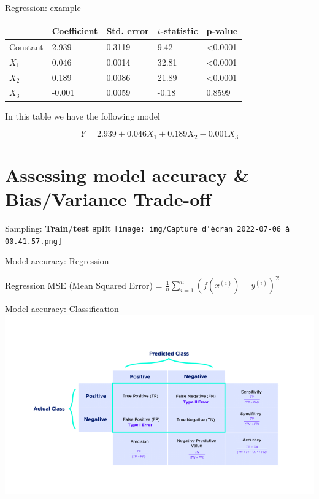 \documentclass[
  9pt,
  ignorenonframetext,
  aspectratio=169,
  t, dvipsnames]{beamer}
\theoremstyle{definition}
\begin{document}
\begin{frame}{Regression: example}
\protect\hypertarget{regression-example}{}
\begin{longtable}[]{@{}lllll@{}}
\toprule()
& Coefficient & Std. error & \(t\)-statistic & p-value \\
\midrule()
\endhead
Constant & 2.939 & 0.3119 & 9.42 & \textless0.0001 \\
\(X_1\) & 0.046 & 0.0014 & 32.81 & \textless0.0001 \\
\(X_2\) & 0.189 & 0.0086 & 21.89 & \textless0.0001 \\
\(X_3\) & -0.001 & 0.0059 & -0.18 & 0.8599 \\
\bottomrule()
\end{longtable}

In this table we have the following model

\[ Y = 2.939 + 0.046 X_1 + 0.189 X_2 - 0.001 X_3 \]
\end{frame}

\hypertarget{assessing-model-accuracy-biasvariance-trade-off}{%
\section{Assessing model accuracy \& Bias/Variance
Trade-off}\label{assessing-model-accuracy-biasvariance-trade-off}}

\begin{frame}{Sampling: \textbf{Train/test split}}
\protect\hypertarget{sampling-traintest-split}{}
\texttt{[image: img/Capture d’écran 2022-07-06 à 00.41.57.png]}
\end{frame}

\begin{frame}{Model accuracy: Regression}
\protect\hypertarget{model-accuracy-regression}{}
\begin{alertblock}{Regression}
MSE (Mean Squared Error) =
\(\frac{1}{n} \sum_{i = 1}^{n} (f(x^{(i)}) - y^{(i)})^2\)

\end{alertblock}
\end{frame}

\begin{frame}{Model accuracy: Classification}
\protect\hypertarget{model-accuracy-classification}{}
\includegraphics{img/cm.png}
\end{frame}
\end{document}
